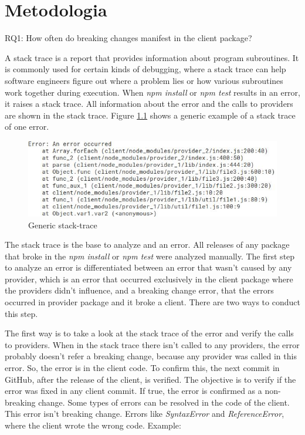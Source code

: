 \chapter{Metodologia}
\label{cap:metodologia}

RQ1: How often do breaking changes manifest in the client package?

A stack trace is a report that provides information about program subroutines. It is commonly used for certain kinds of debugging, where a stack trace can help software engineers figure out where a problem lies or how various subroutines work together during execution. When \textit{npm install} or \textit{npm test} results in an error, it raises a stack trace. All information about the error and the calls to providers are shown in the stack trace. Figure \ref{fig:trace} shows a generic example of a stack trace of one error.

\begin{figure}
    \centering
    \includegraphics[scale=0.7]{figuras/stack_trace.jpeg}
    \caption{Generic stack-trace}
    \label{fig:trace}
\end{figure}{}

The stack trace is the base to analyze and an error.
All releases of any package that broke in the \textit{npm install} or \textit{npm test} were analyzed manually. The first step to analyze an error is differentiated between an error that wasn't caused by any provider, which is an error that occurred exclusively in the client package where the providers didn’t influence, and a breaking change error, that the errors occurred in provider package and it broke a client. There are two ways to conduct this step.

The first way is to take a look at the stack trace of the error and verify the calls to providers. When in the stack trace there isn't called to any providers, the error probably doesn’t refer a breaking change, because any provider was called in this error. So, the error is in the client code. To confirm this, the next commit in GitHub, after the release of the client, is verified. The objective is to verify if the error was fixed in any client commit. If true, the error is confirmed as a non-breaking change.
Some types of errors can be resolved in the code of the client. This error isn’t breaking change. Errors like \textit{SyntaxError} and \textit{ReferenceError}, where the client wrote the wrong code. Example:

